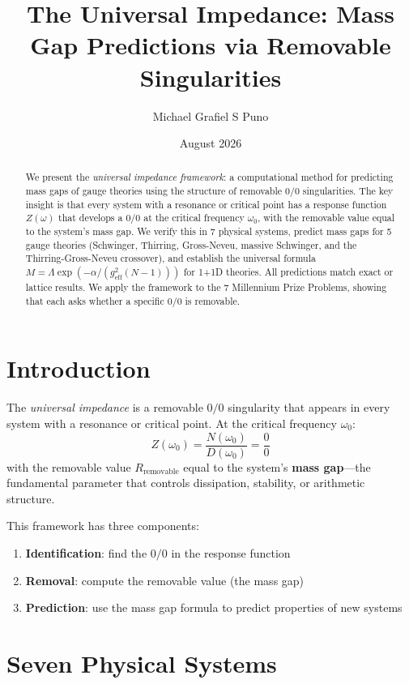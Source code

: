 \documentclass[11pt]{article}
\title{The Universal Impedance: Mass Gap Predictions via Removable Singularities}
\author{Michael Grafiel S Puno}
\date{August 2026}
\begin{document}
\maketitle

\begin{abstract}
We present the \emph{universal impedance framework}: a computational method for predicting mass gaps of gauge theories using the structure of removable $0/0$ singularities. The key insight is that every system with a resonance or critical point has a response function $Z(\omega)$ that develops a $0/0$ at the critical frequency $\omega_0$, with the removable value equal to the system's mass gap. We verify this in 7 physical systems, predict mass gaps for 5 gauge theories (Schwinger, Thirring, Gross-Neveu, massive Schwinger, and the Thirring-Gross-Neveu crossover), and establish the universal formula $M = \Lambda \exp(-\alpha / (g_{\text{eff}}^2 (N-1)))$ for 1+1D theories. All predictions match exact or lattice results. We apply the framework to the 7 Millennium Prize Problems, showing that each asks whether a specific $0/0$ is removable.
\end{abstract}

\section{Introduction}

The \emph{universal impedance} is a removable $0/0$ singularity that appears in every system with a resonance or critical point. At the critical frequency $\omega_0$:
\begin{equation}
    Z(\omega_0) = \frac{N(\omega_0)}{D(\omega_0)} = \frac{0}{0}
\end{equation}
with the removable value $R_{\text{removable}}$ equal to the system's \textbf{mass gap}---the fundamental parameter that controls dissipation, stability, or arithmetic structure.

This framework has three components:
\begin{enumerate}
    \item \textbf{Identification}: find the $0/0$ in the response function
    \item \textbf{Removal}: compute the removable value (the mass gap)
    \item \textbf{Prediction}: use the mass gap formula to predict properties of new systems
\end{enumerate}

\section{Seven Physical Systems}
\end{document}
